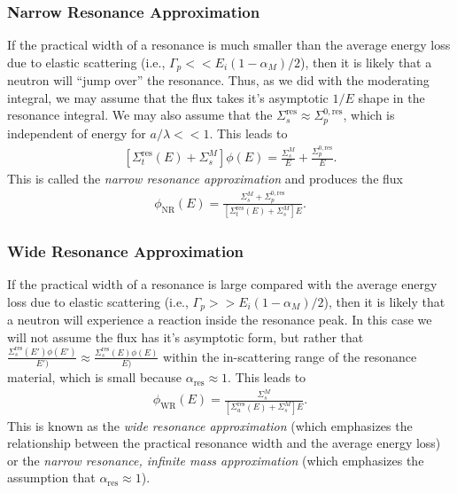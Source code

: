 \documentclass[11pt]{article}
\begin{document}
\subsubsection{Narrow Resonance Approximation}
\label{sec:orgheadline37}
If the practical width of a resonance is much smaller than the average energy loss due to elastic scattering (i.e., \(\Gamma_p << E_i(1-\alpha_M)/2\)), then it is likely that a neutron will ``jump over'' the resonance.  Thus, as we did with the moderating integral, we may assume that the flux takes it's asymptotic \(1/E\) shape in the resonance integral.  We may also assume that the \(\Sigma_s^\text{res} \approx \Sigma_p^{0,\text{res}}\), which is independent of energy for \(a / \lambda << 1\).  This leads to
\begin{align}
  \left[ \Sigma_t^\text{res}(E) + \Sigma_s^M \right] \phi(E)
  = \frac{\Sigma_s^M}{E}
  + \frac{\Sigma_p^{0,\text{res}}}{E}.
\end{align}
This is called the \emph{narrow resonance approximation} and produces the flux
\begin{align}
  \phi_\text{NR}(E)
  = \frac{\Sigma_s^M + \Sigma_p^{0,\text{res}}}{\left[ \Sigma_t^\text{res}(E) + \Sigma_s^M \right]E}.
\end{align}

\subsubsection{Wide Resonance Approximation}
\label{sec:orgheadline38}
If the practical width of a resonance is large compared with the average energy loss due to elastic scattering (i.e., \(\Gamma_p >> E_i(1-\alpha_M)/2\)), then it is likely that a neutron will experience a reaction inside the resonance peak.  In this case we will not assume the flux has it's asymptotic form, but rather that \(\frac{\Sigma_s^\text{res}(E') \phi(E')}{E')} \approx \frac{\Sigma_s^\text{res}(E) \phi(E)}{E)}\) within the in-scattering range of the resonance material, which is small because \(\alpha_\text{res} \approx 1\).  This leads to
\begin{align}
  \phi_\text{WR}(E)
  = \frac{\Sigma_s^M}{\left[ \Sigma_a^\text{res}(E) + \Sigma_s^M \right] E}.
\end{align}
This is known as the \emph{wide resonance approximation} (which emphasizes the relationship between the practical resonance width and the average energy loss) or the \emph{narrow resonance, infinite mass approximation} (which emphasizes the assumption that \(\alpha_\text{res} \approx 1\)).
\end{document}

